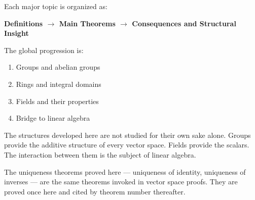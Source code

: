 Each major topic is organized as:
\begin{center}
\textbf{Definitions $\longrightarrow$ Main Theorems
$\longrightarrow$ Consequences and Structural Insight}
\end{center}

The global progression is:
\begin{enumerate}
  \item Groups and abelian groups
  \item Rings and integral domains
  \item Fields and their properties
  \item Bridge to linear algebra
\end{enumerate}

\vspace{1em}

\begin{remark}
The structures developed here are not studied for their own sake alone.
Groups provide the additive structure of every vector space.
Fields provide the scalars. The interaction between them
is the subject of linear algebra.
\end{remark}

\begin{remark}
The uniqueness theorems proved here --- uniqueness of identity,
uniqueness of inverses --- are the same theorems invoked in
vector space proofs. They are proved once here and cited by
theorem number thereafter.
\end{remark}

















